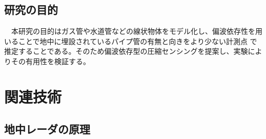 \documentclass[12pt,a4paper]{jsreport}
\begin{document}
\section{研究の目的}
　本研究の目的はガス管や水道管などの線状物体をモデル化し、偏波依存性を用いることで地中に埋設されているパイプ管の有無と向きをより少ない計測点
で推定することである。そのため偏波依存型の圧縮センシングを提案し、実験によりその有用性を検証する。

\chapter{関連技術}
\section{地中レーダの原理}



\clearpage
\end{document}
